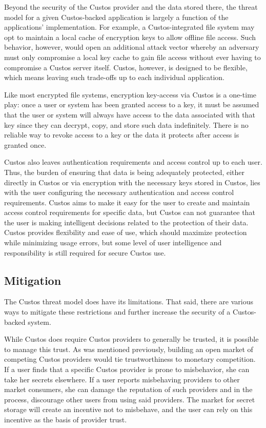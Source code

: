 Beyond the security of the Custos provider and the data stored there,
the threat model for a given Custos-backed application is largely a
function of the applications' implementation. For example, a
Custos-integrated file system may opt to maintain a local cache of
encryption keys to allow offline file access. Such behavior, however,
would open an additional attack vector whereby an adversary must only
compromise a local key cache to gain file access without ever having
to compromise a Custos server itself. Custos, however, is designed to
be flexible, which means leaving such trade-offs up to each individual
application.

Like most encrypted file systems, encryption key-access via Custos is
a one-time play: once a user or system has been granted access to a
key, it must be assumed that the user or system will always have
access to the data associated with that key since they can decrypt,
copy, and store such data indefinitely. There is no reliable way to
revoke access to a key or the data it protects after access is granted
once.

Custos also leaves authentication requirements and access control up
to each user. Thus, the burden of ensuring that data is being
adequately protected, either directly in Custos or via encryption with
the necessary keys stored in Custos, lies with the user configuring
the necessary authentication and access control requirements. Custos
aims to make it easy for the user to create and maintain access
control requirements for specific data, but Custos can not guarantee
that the user is making intelligent decisions related to the
protection of their data. Custos provides flexibility and ease of use,
which should maximize protection while minimizing usage errors, but
some level of user intelligence and responsibility is still required
for secure Custos use.

\subsection{Mitigation}

The Custos threat model does have its limitations. That said, there
are various ways to mitigate these restrictions and further increase
the security of a Custos-backed system.

While Custos does require Custos providers to generally be trusted, it
is possible to manage this trust. As was mentioned previously,
building an open market of competing Custos providers would tie
trustworthiness to monetary competition. If a user finds that a
specific Custos provider is prone to misbehavior, she can take her
secrets elsewhere. If a user reports misbehaving providers to other
market consumers, she can damage the reputation of such providers and
in the process, discourage other users from using said providers. The
market for secret storage will create an incentive not to misbehave,
and the user can rely on this incentive as the basis of provider
trust.

